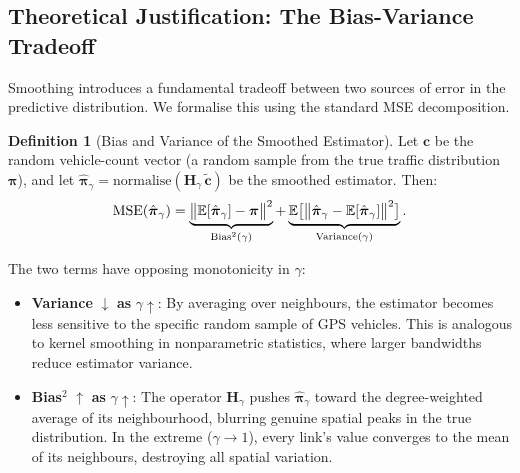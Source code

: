 \documentclass[12pt,a4paper]{article}
\theoremstyle{definition}
\newtheorem{definition}{Definition}[section]
\theoremstyle{plain}
\begin{document}
\subsection{Theoretical Justification: The Bias-Variance Tradeoff}
\label{sec:bv_theory}

Smoothing introduces a fundamental tradeoff between two sources of error in the
predictive distribution. We formalise this using the standard MSE decomposition.

\begin{definition}[Bias and Variance of the Smoothed Estimator]
  Let $\mathbf{c}$ be the random vehicle-count vector (a random sample from the
  true traffic distribution $\boldsymbol{\pi}$), and let
  $\hat{\boldsymbol{\pi}}_\gamma = \text{normalise}(\mathbf{H}_\gamma\,\tilde{\mathbf{c}})$
  be the smoothed estimator. Then:
  \begin{equation}
    \text{MSE}(\hat{\boldsymbol{\pi}}_\gamma)
    = \underbrace{\bigl\|\mathbb{E}[\hat{\boldsymbol{\pi}}_\gamma]
      - \boldsymbol{\pi}\bigr\|^2}_{\text{Bias}^2(\gamma)}
    + \underbrace{\mathbb{E}\bigl[\bigl\|\hat{\boldsymbol{\pi}}_\gamma
      - \mathbb{E}[\hat{\boldsymbol{\pi}}_\gamma]\bigr\|^2\bigr]}_{%
      \text{Variance}(\gamma)}.
    \label{eq:bv_decomp}
  \end{equation}
\end{definition}

The two terms have opposing monotonicity in $\gamma$:

\begin{itemize}
  \item \textbf{Variance} $\downarrow$ \textbf{as} $\gamma \uparrow$: By averaging over
    neighbours, the estimator becomes less sensitive to the specific random sample of
    GPS vehicles. This is analogous to kernel smoothing in nonparametric statistics,
    where larger bandwidths reduce estimator variance.

  \item \textbf{Bias}$^2$ $\uparrow$ \textbf{as} $\gamma \uparrow$: The operator
    $\mathbf{H}_\gamma$ pushes $\hat{\boldsymbol{\pi}}_\gamma$ toward the
    degree-weighted average of its neighbourhood, blurring genuine spatial peaks in the
    true distribution. In the extreme ($\gamma \to 1$), every link's value converges
    to the mean of its neighbours, destroying all spatial variation.
\end{itemize}
\end{document}
